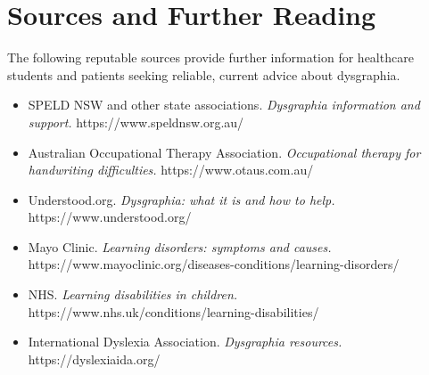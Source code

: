 \section*{Sources and Further Reading}
The following reputable sources provide further information for healthcare students and patients seeking reliable, current advice about dysgraphia.
\begin{itemize}
    \item SPELD NSW and other state associations. \textit{Dysgraphia information and support.} https://www.speldnsw.org.au/
    \item Australian Occupational Therapy Association. \textit{Occupational therapy for handwriting difficulties.} https://www.otaus.com.au/
    \item Understood.org. \textit{Dysgraphia: what it is and how to help.} https://www.understood.org/
    \item Mayo Clinic. \textit{Learning disorders: symptoms and causes.} https://www.mayoclinic.org/diseases-conditions/learning-disorders/
    \item NHS. \textit{Learning disabilities in children.} https://www.nhs.uk/conditions/learning-disabilities/
    \item International Dyslexia Association. \textit{Dysgraphia resources.} https://dyslexiaida.org/
\end{itemize}
